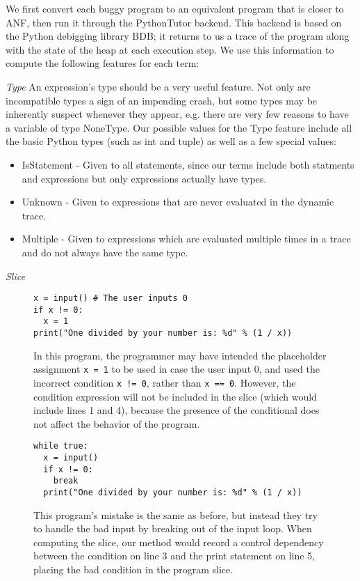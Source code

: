 \documentclass[conference]{IEEEtran}
\begin{document}
We first convert each buggy program to an equivalent program that is closer
to ANF, then run it through the PythonTutor backend. This backend is based on the
Python debigging library BDB; it returns to us a trace of the program along with
the state of the heap at each execution step. We use this information to compute
the following features for each term:

\emph{Type} An expression's type should be a very useful feature. Not only are
incompatible types a sign of an impending crash, but some types may be inherently
suspect whenever they appear, e.g. there are very few reasons to have a variable
of type NoneType. Our possible values for the Type feature include all the basic Python
types (such as int and tuple) as well as a few special values:
\begin{itemize}
    \item IsStatement - Given to all statements, since our terms include both
    statments and expressions but only expressions actually have types.
    \item Unknown - Given to expressions that are never evaluated in the dynamic
    trace.
    \item Multiple - Given to expressions which are evaluated multiple times in
    a trace and do not always have the same type.
\end{itemize}

\emph{Slice}
\begin{figure}
\begin{lstlisting}
x = input() # The user inputs 0
if x != 0:
  x = 1
print("One divided by your number is: %d" % (1 / x))
\end{lstlisting}
\caption{In this program, the programmer may have intended the placeholder
  assignment \texttt{x = 1} to be used in case the user input 0, and used the
  incorrect condition \texttt{x != 0}, rather than \texttt{x == 0}. However, the
  condition expression will not be included in the slice (which would include
  lines 1 and 4), because the presence of
  the conditional does not affect the behavior of the program.
}
\label{slice-downside-example}
\end{figure}

\begin{figure}
\begin{lstlisting}
while true:
  x = input()
  if x != 0:
    break
  print("One divided by your number is: %d" % (1 / x))
\end{lstlisting}
\caption{
  This program's mistake is the same as before,
  but instead they try to handle the
  bad input by breaking out of the input loop. When computing the slice, our
  method would record a control dependency between the condition on line 3 and
  the print statement on line 5, placing the bad condition in the program slice.
}
\label{early-break}
\end{figure}
\end{document}
